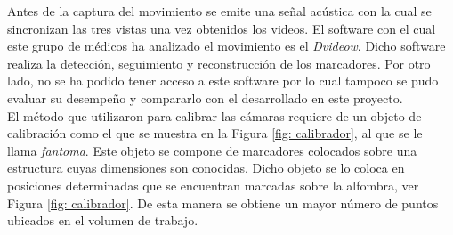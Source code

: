 Antes de la captura del movimiento se emite una señal acústica con la cual se sincronizan las tres vistas una vez obtenidos los videos. El software con el cual este grupo de médicos ha analizado el movimiento es el \textit{Dvideow}.            
 Dicho software realiza la detección, seguimiento y reconstrucción de los marcadores. Por otro lado, no se ha podido tener acceso a este software por lo cual tampoco se pudo evaluar su desempeño y compararlo con el desarrollado en este proyecto.\\

El método que utilizaron para calibrar las cámaras requiere de un objeto de calibración como el que se muestra en la Figura \ref{fig: calibrador}, al que se le llama \textit{fantoma}. Este objeto se compone de marcadores colocados sobre una estructura cuyas dimensiones son conocidas. Dicho objeto se lo coloca en posiciones determinadas que se encuentran marcadas sobre la alfombra, ver Figura \ref{fig: calibrador}. De esta manera se obtiene un mayor número de puntos ubicados en el volumen de trabajo.\\


